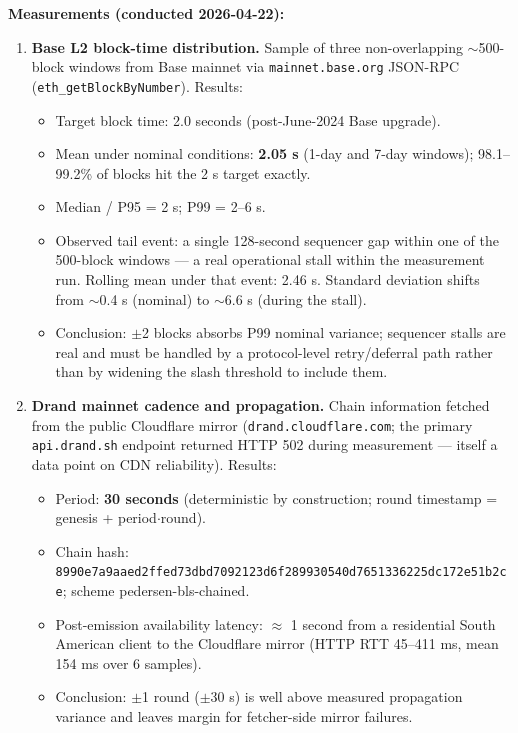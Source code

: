 \documentclass[11pt]{article}
\begin{document}
\textbf{Measurements (conducted 2026-04-22):}

\begin{enumerate}
\item \textbf{Base L2 block-time distribution.} Sample of three non-overlapping $\sim$500-block windows from Base mainnet via \texttt{mainnet.base.org} JSON-RPC (\texttt{eth\_getBlockByNumber}). Results:
\begin{itemize}
\item Target block time: 2.0 seconds (post-June-2024 Base upgrade).
\item Mean under nominal conditions: \textbf{2.05 s} (1-day and 7-day windows); 98.1--99.2\% of blocks hit the 2 s target exactly.
\item Median / P95 = 2 s; P99 = 2--6 s.
\item Observed tail event: a single 128-second sequencer gap within one of the 500-block windows --- a real operational stall within the measurement run. Rolling mean under that event: 2.46 s. Standard deviation shifts from $\sim$0.4 s (nominal) to $\sim$6.6 s (during the stall).
\item Conclusion: $\pm$2 blocks absorbs P99 nominal variance; sequencer stalls are real and must be handled by a protocol-level retry/deferral path rather than by widening the slash threshold to include them.
\end{itemize}

\item \textbf{Drand mainnet cadence and propagation.} Chain information fetched from the public Cloudflare mirror (\texttt{drand.cloudflare.com}; the primary \texttt{api.drand.sh} endpoint returned HTTP 502 during measurement --- itself a data point on CDN reliability). Results:
\begin{itemize}
\item Period: \textbf{30 seconds} (deterministic by construction; round timestamp = genesis + period$\cdot$round).
\item Chain hash: \texttt{8990e7a9aaed2ffed73dbd7092123d6f289930540d7651336225dc172e51b2ce}; scheme pedersen-bls-chained.
\item Post-emission availability latency: $\approx$ 1 second from a residential South American client to the Cloudflare mirror (HTTP RTT 45--411 ms, mean 154 ms over 6 samples).
\item Conclusion: $\pm$1 round ($\pm$30 s) is well above measured propagation variance and leaves margin for fetcher-side mirror failures.
\end{itemize}


\end{enumerate}
\end{document}
